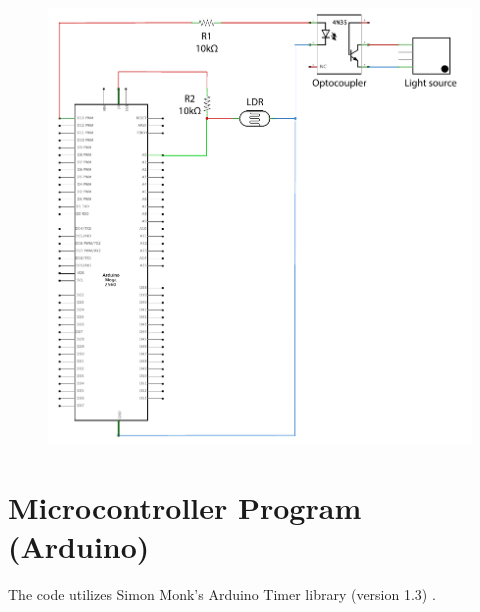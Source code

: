 \documentclass[thesis.tex]{subfiles}
\begin{document}
\begin{figure}[h]
\centering \includegraphics[width=12cm]{images/design_implementation/arduino_schematics.pdf}
\end{figure}





\chapter{Microcontroller Program (Arduino)}
\label{appendix:microcontroller-program}

The code utilizes Simon Monk's Arduino Timer library (version 1.3) \cite{arduino_timer_library}.




\end{document}
